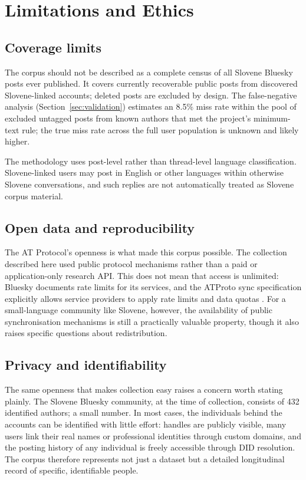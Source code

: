 \section{Limitations and Ethics}\label{sec:limitations}

\subsection{Coverage limits}

The corpus should not be described as a complete census of all Slovene Bluesky posts ever published. It covers currently recoverable public posts from discovered Slovene-linked accounts; deleted posts are excluded by design. The false-negative analysis (Section~\ref{sec:validation}) estimates an 8.5\% miss rate within the pool of excluded untagged posts from known authors that met the project's minimum-text rule; the true miss rate across the full user population is unknown and likely higher.

The methodology uses post-level rather than thread-level language classification. Slovene-linked users may post in English or other languages within otherwise Slovene conversations, and such replies are not automatically treated as Slovene corpus material.

\subsection{Open data and reproducibility}

The AT Protocol's openness is what made this corpus possible. The collection described here used public protocol mechanisms rather than a paid or application-only research API. This does not mean that access is unlimited: Bluesky documents rate limits for its services, and the ATProto sync specification explicitly allows service providers to apply rate limits and data quotas \parencite{atproto-sync,bsky-ratelimits}. For a small-language community like Slovene, however, the availability of public synchronisation mechanisms is still a practically valuable property, though it also raises specific questions about redistribution.

\subsection{Privacy and identifiability}

The same openness that makes collection easy raises a concern worth stating plainly. The Slovene Bluesky community, at the time of collection, consists of 432 identified authors; a small number. In most cases, the individuals behind the accounts can be identified with little effort: handles are publicly visible, many users link their real names or professional identities through custom domains, and the posting history of any individual is freely accessible through DID resolution. The corpus therefore represents not just a dataset but a detailed longitudinal record of specific, identifiable people.

